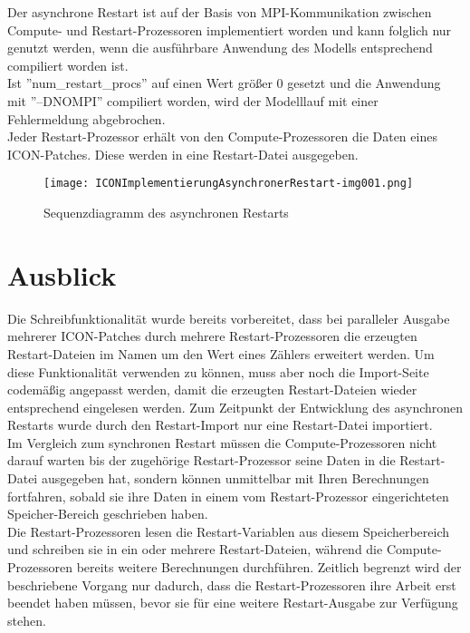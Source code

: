 \documentclass[a4paper,10pt,DIV14]{scrartcl}
\begin{document}
Der asynchrone Restart ist auf der Basis von MPI-Kommunikation zwischen Compute- und Restart-Prozessoren implementiert
worden und kann folglich nur genutzt werden, wenn die ausf\"uhrbare Anwendung des Modells entsprechend compiliert worden ist.\\

Ist ''num\_restart\_procs'' auf einen Wert gr\"o\ss er 0 gesetzt und die Anwendung mit ''–DNOMPI'' compiliert worden, wird der Modelllauf
mit einer Fehlermeldung abgebrochen.\\

Jeder Restart-Prozessor erh\"alt von den Compute-Prozessoren die Daten eines ICON-Patches.
Diese werden in eine Restart-Datei ausgegeben. 

\begin{figure}
 \texttt{[image: ICONImplementierungAsynchronerRestart-img001.png]}
 \caption{Sequenzdiagramm des asynchronen Restarts}
\end{figure} 


\section{Ausblick}

Die Schreibfunktionalit\"at wurde bereits vorbereitet, dass bei paralleler Ausgabe mehrerer ICON-Patches durch mehrere
Restart-Prozessoren die erzeugten Restart-Dateien im Namen um den Wert eines Z\"ahlers erweitert werden.
Um diese Funktionalit\"at verwenden zu k\"onnen, muss aber noch die Import-Seite codem\"a\ss ig angepasst werden, damit die
erzeugten Restart-Dateien wieder entsprechend eingelesen werden.
Zum Zeitpunkt der Entwicklung des asynchronen Restarts wurde durch den Restart-Import nur eine Restart-Datei importiert.\\

Im Vergleich zum synchronen Restart m\"ussen die Compute-Prozessoren nicht darauf warten bis der zugeh\"orige Restart-Prozessor
seine Daten in die Restart-Datei ausgegeben hat, sondern k\"onnen unmittelbar mit Ihren Berechnungen fortfahren, sobald sie
ihre Daten in einem vom Restart-Prozessor eingerichteten Speicher-Bereich geschrieben haben.\\

Die Restart-Prozessoren lesen die Restart-Variablen aus diesem Speicherbereich und schreiben sie in ein oder mehrere
Restart-Dateien, w\"ahrend die Compute-Prozessoren bereits weitere Berechnungen durchf\"uhren.
Zeitlich begrenzt wird der beschriebene Vorgang nur dadurch, dass die Restart-Prozessoren ihre Arbeit erst beendet
haben m\"ussen, bevor sie f\"ur eine weitere Restart-Ausgabe zur Verf\"ugung stehen.\\
\end{document}
